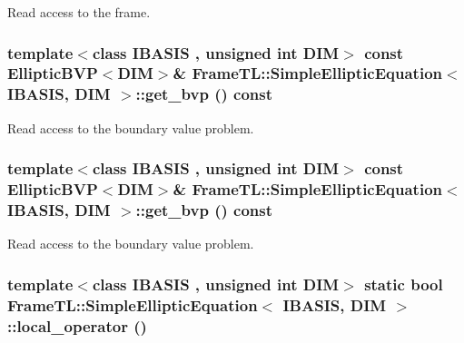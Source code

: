 Read access to the frame. \hypertarget{classFrameTL_1_1SimpleEllipticEquation_d1559772cff60c00487587b4a160a60f}{
\subsubsection[{get\_\-bvp}]{\setlength{\rightskip}{0pt plus 5cm}template$<$class IBASIS , unsigned int DIM$>$ const EllipticBVP$<$DIM$>$\& {\bf FrameTL::SimpleEllipticEquation}$<$ IBASIS, DIM $>$::get\_\-bvp () const}}
\label{classFrameTL_1_1SimpleEllipticEquation_d1559772cff60c00487587b4a160a60f}


Read access to the boundary value problem. \hypertarget{classFrameTL_1_1SimpleEllipticEquation_d1559772cff60c00487587b4a160a60f}{
\subsubsection[{get\_\-bvp}]{\setlength{\rightskip}{0pt plus 5cm}template$<$class IBASIS , unsigned int DIM$>$ const EllipticBVP$<$DIM$>$\& {\bf FrameTL::SimpleEllipticEquation}$<$ IBASIS, DIM $>$::get\_\-bvp () const}}
\label{classFrameTL_1_1SimpleEllipticEquation_d1559772cff60c00487587b4a160a60f}


Read access to the boundary value problem. \hypertarget{classFrameTL_1_1SimpleEllipticEquation_cd41f35521f8ac7af05fd0294cbf76ef}{
\subsubsection[{local\_\-operator}]{\setlength{\rightskip}{0pt plus 5cm}template$<$class IBASIS , unsigned int DIM$>$ static bool {\bf FrameTL::SimpleEllipticEquation}$<$ IBASIS, DIM $>$::local\_\-operator ()}}
\label{classFrameTL_1_1SimpleEllipticEquation_cd41f35521f8ac7af05fd0294cbf76ef}


